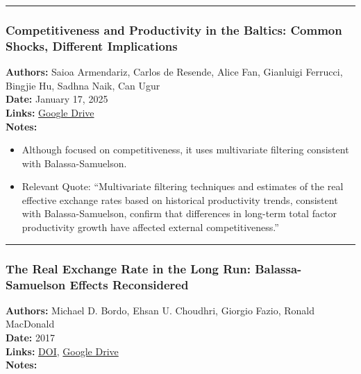 \documentclass[
  11pt,
]{article}
\providecommand{\tightlist}{%
  \setlength{\itemsep}{0pt}\setlength{\parskip}{0pt}}
\begin{document}
\begin{center}\rule{0.5\linewidth}{0.5pt}\end{center}

\subsubsection{Competitiveness and Productivity in the Baltics: Common
Shocks, Different
Implications}\label{competitiveness-and-productivity-in-the-baltics-common-shocks-different-implications}

\textbf{Authors:} Saioa Armendariz, Carlos de Resende, Alice Fan,
Gianluigi Ferrucci, Bingjie Hu, Sadhna Naik, Can Ugur\\
\textbf{Date:} January 17, 2025\\
\textbf{Links:}
\href{https://drive.google.com/file/d/1GFUm5ckExKBUJ7CXxZ4ZyplTKT2Krc28/view?usp=sharing}{Google
Drive}\\
\textbf{Notes:}

\begin{itemize}
\tightlist
\item
  Although focused on competitiveness, it uses multivariate filtering
  consistent with Balassa-Samuelson.
\item
  Relevant Quote: ``Multivariate filtering techniques and estimates of
  the real effective exchange rates based on historical productivity
  trends, consistent with Balassa-Samuelson, confirm that differences in
  long-term total factor productivity growth have affected external
  competitiveness.''
\end{itemize}

\begin{center}\rule{0.5\linewidth}{0.5pt}\end{center}

\subsubsection{The Real Exchange Rate in the Long Run: Balassa-Samuelson
Effects
Reconsidered}\label{the-real-exchange-rate-in-the-long-run-balassa-samuelson-effects-reconsidered}

\textbf{Authors:} Michael D. Bordo, Ehsan U. Choudhri, Giorgio Fazio,
Ronald MacDonald\\
\textbf{Date:} 2017\\
\textbf{Links:}
\href{https://doi.org/10.1016/j.jimonfin.2017.03.011}{DOI},
\href{https://drive.google.com/file/d/1wpLTPo2OgVXe54w8JiDwyBwYTGqkBz4I/view?usp=sharing}{Google
Drive}\\
\textbf{Notes:}
\end{document}
